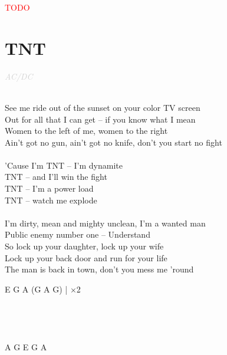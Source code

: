 \documentclass[a5paper, 10pt]{book}
\begin{document}
\begin{minipage}[t]{0.3\textwidth}
\textcolor{red}{TODO}\\
\end{minipage}

\newpage
\section{TNT}\textcolor{lightgray}{\textit{AC/DC}}\\~\\
\begin{minipage}[t]{0.7\textwidth}
See me ride out of the sunset on your color TV screen\\
Out for all that I can get – if you know what I mean\\
Women to the left of me, women to the right\\
Ain’t got no gun, ain’t got no knife, don’t you start no fight\\
\\
\hspace*{5mm}’Cause I’m TNT – I’m dynamite \\
\hspace*{5mm}TNT – and I’ll win the fight\\
\hspace*{5mm}TNT – I’m a power load\\
\hspace*{5mm}TNT – watch me explode\\
\\
I’m dirty, mean and mighty unclean, I’m a wanted man\\
Public enemy number one – Understand\\
So lock up your daughter, lock up your wife\\
Lock up your back door and run for your life\\
The man is back in town, don’t you mess me ’round\\
\end{minipage}
\begin{minipage}[t]{0.3\textwidth}
 E G A (G A G) | $\times$2\\
 \\
 \\
 \\
 \\
A G E G A
\end{minipage}

\newpage
\end{document}
